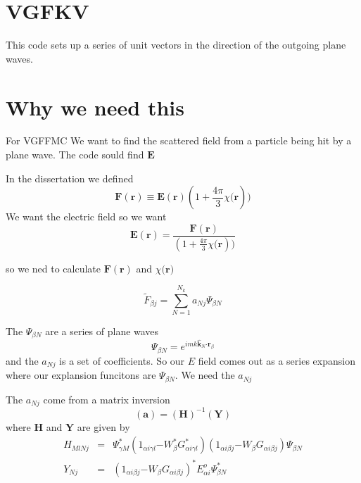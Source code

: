 \documentclass{article}
\begin{document}
\section{VGFKV}

This code sets up a series of unit vectors in the direction of the outgoing
plane waves.

\section{Why we need this}

For VGFFMC We want to find the scattered field from a particle being hit by
a plane wave. The code sould find $\mathbf{E}$

In the dissertation we defined 
\begin{equation}
\mathbf{F}(\mathbf{r})\equiv \mathbf{E}(\mathbf{r})(1+\frac{4\pi }{3}\chi 
\mathbf{(r}))  \tag{38}  \label{EtoF}
\end{equation}%
We want the electric field so we want%
\[
\mathbf{E}(\mathbf{r})=\frac{\mathbf{F}(\mathbf{r})}{(1+\frac{4\pi }{3}\chi 
\mathbf{(r}))} 
\]

so we ned to calculate $\mathbf{F}(\mathbf{r})$ and $\chi \mathbf{(r})$

\begin{equation}
\tilde{F}_{\beta j}\mathbf{=}\sum_{N=1}^{N_{k}}a_{Nj}\Psi _{\beta N}
\label{CPSI}
\end{equation}

The $\Psi _{\beta N}$ are a series of plane waves%
\begin{equation}
\Psi _{\beta N}=e^{imk\mathbf{\hat{k}}_{N}\mathbf{\cdot r}_{\beta }}
\end{equation}%
and the $a_{Nj}$ is a set of coefficients. So our $E$ field comes out as a
series expansion where our explansion funcitons are $\Psi _{\beta N}$. We
need the $a_{Nj}$

The $a_{Nj}$ come from a matrix inversion 
\begin{equation}
\left( \mathbf{a}\right) =\left( \mathbf{H}\right) ^{-1}\left( \mathbf{Y}%
\right)  \label{aHY}
\end{equation}%
where $\mathbf{H}$ and $\mathbf{Y}$ are given by 
\begin{eqnarray}
H_{MlNj} &=&\Psi _{\gamma M}^{\ast }\left( 1_{\alpha i\gamma l}\mathbf{-}%
W_{\beta }^{\ast }G_{\alpha i\gamma l}^{\ast }\right) \left( 1_{\alpha
i\beta j}\mathbf{-}W_{\beta }G_{\alpha i\beta j}\right) \Psi _{\beta N} 
\nonumber \\
Y_{Nj} &=&\left( 1_{\alpha i\beta j}\mathbf{-}W_{\beta }G_{\alpha i\beta
j}\right) ^{\ast }E_{\alpha i}^{o}\Psi _{\beta N}^{\ast }
\end{eqnarray}
\end{document}

